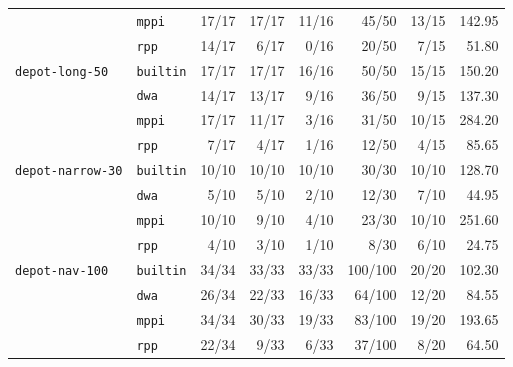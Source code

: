 \begin{table}[t]
\begin{tabular}{llrrrrrr}
 & \texttt{mppi} & 17/17 & 17/17 & 11/16 & 45/50 & 13/15 & 142.95 \\
 & \texttt{rpp} & 14/17 & 6/17 & 0/16 & 20/50 & 7/15 & 51.80 \\
\midrule
\texttt{depot-long-50} & \texttt{builtin} & 17/17 & 17/17 & 16/16 & 50/50 & 15/15 & 150.20 \\
 & \texttt{dwa} & 14/17 & 13/17 & 9/16 & 36/50 & 9/15 & 137.30 \\
 & \texttt{mppi} & 17/17 & 11/17 & 3/16 & 31/50 & 10/15 & 284.20 \\
 & \texttt{rpp} & 7/17 & 4/17 & 1/16 & 12/50 & 4/15 & 85.65 \\
\midrule
\texttt{depot-narrow-30} & \texttt{builtin} & 10/10 & 10/10 & 10/10 & 30/30 & 10/10 & 128.70 \\
 & \texttt{dwa} & 5/10 & 5/10 & 2/10 & 12/30 & 7/10 & 44.95 \\
 & \texttt{mppi} & 10/10 & 9/10 & 4/10 & 23/30 & 10/10 & 251.60 \\
 & \texttt{rpp} & 4/10 & 3/10 & 1/10 & 8/30 & 6/10 & 24.75 \\
\midrule
\texttt{depot-nav-100} & \texttt{builtin} & 34/34 & 33/33 & 33/33 & 100/100 & 20/20 & 102.30 \\
 & \texttt{dwa} & 26/34 & 22/33 & 16/33 & 64/100 & 12/20 & 84.55 \\
 & \texttt{mppi} & 34/34 & 30/33 & 19/33 & 83/100 & 19/20 & 193.65 \\
 & \texttt{rpp} & 22/34 & 9/33 & 6/33 & 37/100 & 8/20 & 64.50 \\
\bottomrule
\end{tabular}
\end{table}
